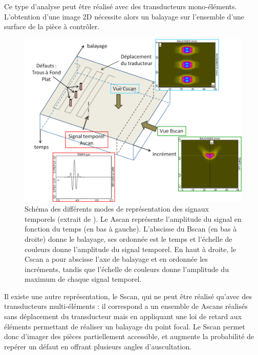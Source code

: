 Ce type d'analyse peut être réalisé avec des transducteurs mono-éléments. L'obtention d'une image 2D nécessite alors un balayage sur l'ensemble d'une surface de la pièce à contrôler. \\


\begin{figure}
	\centering
	\includegraphics[scale=0.7]{img/scan2.png}
	\caption{\label{scan} Schéma des différents modes de représentation des signaux temporels (extrait de \cite{bannouf}). Le Ascan représente l'amplitude du signal en fonction du temps (en bas à gauche). L'abscisse du Bscan (en bas à droite) donne le balayage, ses ordonnée est le temps et l'échelle de couleurs donne l'amplitude du signal temporel. En haut à droite, le Cscan a pour abscisse l'axe de balayage et en ordonnée les incréments, tandis que l'échelle de couleurs donne l'amplitude du maximum de chaque signal temporel.}
\end{figure}

Il existe une autre représentation, le Sscan, qui ne peut être réalisé qu'avec des transducteurs multi-éléments : il correspond a un ensemble de Ascans réalisés sans déplacement du transducteur mais en appliquant une loi de retard aux éléments permettant de réaliser un balayage du point focal. Le Sscan permet donc d'imager des pièces partiellement accessible, et augmente la probabilité de repérer un défaut en offrant plusieurs angles d'auscultation.\\


